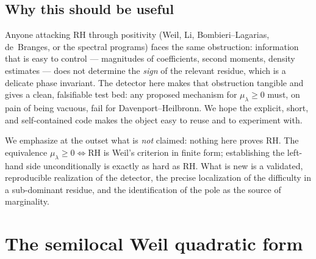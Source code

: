 \documentclass[11pt]{amsart}
\theoremstyle{definition}
\theoremstyle{remark}
\newcommand{\lam}{\lambda}
\begin{document}
\subsection*{Why this should be useful}
Anyone attacking RH through positivity (Weil, Li, Bombieri--Lagarias, de~Branges, or the spectral programs) faces the same obstruction: information that is easy to control --- magnitudes of coefficients, second moments, density estimates --- does not determine the \emph{sign} of the relevant residue, which is a delicate phase invariant. The detector here makes that obstruction tangible and gives a clean, falsifiable test bed: any proposed mechanism for $\mu_\lam\ge0$ must, on pain of being vacuous, fail for Davenport--Heilbronn. We hope the explicit, short, and self-contained code makes the object easy to reuse and to experiment with.

We emphasize at the outset what is \emph{not} claimed: nothing here proves RH. The equivalence $\mu_\lam\ge0\Leftrightarrow\text{RH}$ is Weil's criterion in finite form; establishing the left-hand side unconditionally is exactly as hard as RH. What is new is a validated, reproducible realization of the detector, the precise localization of the difficulty in a sub-dominant residue, and the identification of the pole as the source of marginality.

\section{The semilocal Weil quadratic form}\label{sec:construction}
\end{document}
